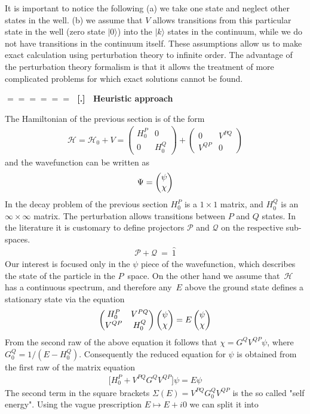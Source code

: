 \documentclass[onecolumn,fleqn]{revtex4}
\newcommand{\amatrix}[1]{\begin{matrix} #1 \end{matrix}}
\newcommand{\beq}{\begin{eqnarray}}
\newcommand{\eeq}{\end{eqnarray}}
\renewcommand{\thesubsection}{\arabic{subsection}}
\renewcommand{\thesubsubsection}{\arabic{subsubsection}}
\newcommand{\sheadC}[1]
{
\addtocounter{subsubsection}{1}
\vspace{5mm}
{\Large\bf $=\!=\!=\!=\!=\!=\;$ [\thesubsection.\thesubsubsection] \ #1}  
\nopagebreak
\phantomsection
}
\begin{document}
It is important to notice the following (a) we take one state and
neglect other states in the well. (b) we assume that $V$ allows 
transitions from this particular state in the well (zero state $|0\rangle $) 
into the $|k\rangle$ states in the continuum, while we do not have transitions 
in the continuum itself. These assumptions allow us to make exact 
calculation using perturbation theory to infinite order.
The advantage of the perturbation theory formalism 
is that it allows the treatment of more complicated 
problems for which exact solutions cannot be found. 





\sheadC{Heuristic approach}

The Hamiltonian of the previous section is of the form 
\beq 
\mathcal{H} = \mathcal{H}_0 + V = 
\left( 
\begin{array}{cc} 
H_0^P & 0 \\
0 & H_0^Q 
\end{array} 
\right) 
+
\left( 
\begin{array}{cc} 
0 & V^{PQ} \\
V^{QP} & 0 
\end{array} 
\right)
\eeq
and the wavefunction can be written as 
\beq
\Psi = \left(\amatrix{\psi \cr \chi}\right) 
\eeq 
In the decay problem of the previous section $H_0^P$ is a $1\times 1$ matrix, 
and $H_0^Q$ is an $\infty\times\infty$ matrix. 
The perturbation allows transitions between $P$ and $Q$ states.
In the literature it is customary to define 
projectors $\mathcal{P}$ and $\mathcal{Q}$ on the respective sub-spaces.
\beq 
\mathcal{P}+ \mathcal{Q} \ = \ \hat{1} 
\eeq
Our interest is focused only in the $\psi$ piece 
of the wavefunction, which describes the 
state of the particle in the $P$~space.
On the other hand we assume that~$\mathcal{H}$    
has a continuous spectrum, and therefore any~$E$ 
above the ground state defines 
a stationary state via the equation
\beq
\left(\amatrix{H_0^{P} & V^{PQ} \cr V^{QP} & H_0^{Q}}\right)   
\left(\amatrix{\psi \cr \chi}\right) 
= E \left(\amatrix{\psi \cr \chi}\right) 
\eeq 
From the second raw of the above equation 
it follows that $\chi=G^{Q} V^{QP} \psi$, 
where $G_0^{Q}=1/(E-H_0^{Q})$. 
Consequently the reduced equation for $\psi$ is 
obtained from the first raw of the matrix equation 
\beq
\Big[ H_0^{P} + V^{PQ} G^{Q} V^{QP} \Big] \psi = E \psi
\eeq 
The second term in the square brackets $\Sigma(E)=V^{PQ} G_0^{Q} V^{QP}$
is the so called "self energy". Using the vague 
prescription ${E\mapsto E+i0}$  we can split it into 
\end{document}
